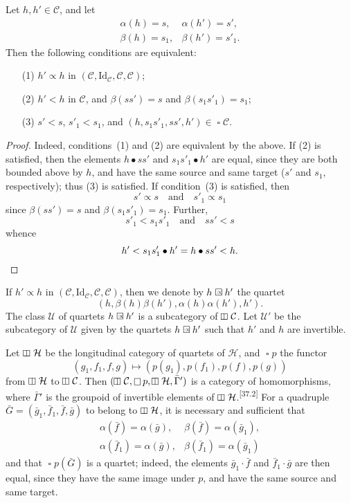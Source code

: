 \documentclass[a4paper,fleqn]{article}
\makeatletter
\theoremstyle{plain}
\newenvironment{proposition}[1]
  {\renewcommand\theinnerproposition{#1}\innerproposition}
  {\endinnerproposition}
\theoremstyle{definition}
\def\blfootnote{\xdef\@thefnmark{}\@footnotetext}
\newcommand{\comm}[2]{{\normalfont\textsuperscript{[#1]}}\blfootnote{\label{footnote:#1}\textbf{[#1]} #2}}
\newcommand{\textand}{\quad\text{and}\quad}
\newcommand{\CC}{\mathcal{C}}
\newcommand{\HH}{\mathcal{H}}
\newcommand{\UU}{\mathcal{U}}
\newcommand{\subs}{\mathrel{\propto}}
\newcommand{\Id}{\mathrm{Id}}
\DeclareMathOperator{\sq}{\square}
\DeclareMathOperator{\vsq}{\raisebox{-.1em}{\rotatebox{90}{$\boxminus$}\,}}
\newcommand{\sqsubs}{\mathrel{\mathrlap{\square}\raisebox{.17em}{\scaleobj{0.65}{\,\,\propto}}}}
\makeatother
\begin{document}
\begin{proposition}{8}
\label{proposition:i-8}
  Let $h,h'\in\CC$, and let
  \[
    \begin{array}{ll}
      \alpha(h)
      = s,
      &\alpha(h')
      = s',
    \\\beta(h)
      = s_1,
      &\beta(h')
      = s'_1.
    \end{array}
  \]
  Then the following conditions are equivalent:
  \begin{enumerate}
    \item[\normalfont(1)]
      $h'\subs h$ in $(\CC,\Id_\CC,\CC,\CC)$;
    \item[\normalfont(2)]
      $h'<h$ in $\CC$, and $\beta(ss')=s$ and $\beta(s_1s'_1)=s_1$;
    \item[\normalfont(3)]
      $s'<s$, $s'_1<s_1$, and $(h,s_1s'_1,ss',h')\in\sq\CC$.
  \end{enumerate}
\end{proposition}

\begin{proof}
  Indeed, conditions~(1) and (2) are equivalent by the above.
  If (2) is satisfied, then the elements $h\bullet ss'$ and $s_1s'_1\bullet h'$ are equal, since they are both bounded above by $h$, and have the same source and same target ($s'$ and $s_1$, respectively);
  thus (3) is satisfied.
  If condition~(3) is satisfied, then
  \[
    s'\subs s
    \textand
    s'_1\subs s_1
  \]
  since $\beta(ss')=s$ and $\beta(s_1s'_1)=s_1$.
  Further,
  \[
    s'_1<s_1s'_1
    \textand
    ss'<s
  \]
  whence
  \[
    h'
    < s_1s'_1\bullet h'
    = h\bullet ss'
    < h.
    \qedhere
  \]
\end{proof}

If $h'\subs h$ in $(\CC,\Id_\CC,\CC,\CC)$, then we denote by $h\sqsubs h'$ the quartet
\[
  (h,\beta(h)\beta(h'),\alpha(h)\alpha(h'),h').
\]
The class $\UU$ of quartets $h\sqsubs h'$ is a subcategory of $\vsq\CC$.
Let $\UU'$ be the subcategory of $\UU$ given by the quartets $h\sqsubs h'$ such that $h'$ and $h$ are invertible.

Let $\vsq\HH$ be the longitudinal category of quartets of $\HH$, and $\sq p$ the functor
\[
  (g_1,f_1,f,g)
  \longmapsto (p(g_1),p(f_1),p(f),p(g))
\]
from $\vsq\HH$ to $\vsq\CC$.
Then $(\vsq\CC,\sq p,\vsq\HH,\bar{\Gamma}')$ is a category of homomorphisms, where $\bar{\Gamma}'$ is the groupoid of invertible elements of $\vsq\HH$.\comm{37.2}{This is easy to prove (cf. \cite[Chapter~II]{coll122}).}
For a quadruple $\bar{G}=(\bar{g}_1,\bar{f}_1,\bar{f},\bar{g})$ to belong to $\vsq\HH$, it is necessary and sufficient that
\[
  \begin{array}{ll}
    \alpha(\bar{f})=\alpha(\bar{g}),
    & \beta(\bar{f})=\alpha(\bar{g}_1),
  \\\alpha(\bar{f}_1)=\alpha(\bar{g}),
    & \beta(\bar{f}_1)=\alpha(\bar{g}_1)
  \end{array}
\]
and that $\sq p(\bar{G})$ is a quartet;
indeed, the elements $\bar{g}_1\cdot\bar{f}$ and $\bar{f}_1\cdot\bar{g}$ are then equal, since they have the same image under $p$, and have the same source and same target.
\end{document}
